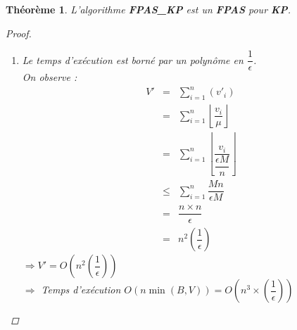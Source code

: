 \documentclass[12pt]{article}
\newcommand{\titre}[1]{\textcolor{title}{#1}}
\newcommand{\cdil}[1]{\left\lfloor #1 \right\rfloor}
\newtheorem{thm}{Th\'eor\`eme}[section]
\newtheorem{proof}{Preuve}[section]
\begin{document}
\begin{thm}
L'algorithme \textbf{FPAS\_KP} est un \textbf{FPAS} pour \textbf{\titre{KP}}.
\begin{proof}$ $
\begin{enumerate}
\item[a)] Le temps d'exécution est borné par un polynôme en $\dfrac{1}{\epsilon}$. \\
On observe :
\begin{eqnarray}
\nonumber V' & = & \sum_{i=1}^n(v'_i) \\
\nonumber    & = & \sum_{i=1}^n\cdil{\dfrac{v_i}{\mu}} \\
\nonumber    & = & \sum_{i=1}^n \cdil{\dfrac{v_i}{\dfrac{\epsilon M}{n}}} \\
\nonumber    & \leq & \sum_{i=1}^n \dfrac{Mn}{\epsilon M} \\
\nonumber    & = & \dfrac{n\times n}{\epsilon} \\
\nonumber    & = & n^2\left(\dfrac{1}{\epsilon}\right)
\end{eqnarray}
$\Rightarrow V'= O\left(n^2\left(\dfrac{1}{\epsilon}\right)\right)$\\
$\Longrightarrow$ Temps d'exécution $O(n\min(B,V)) = O\left(n^3\times \left(\dfrac{1}{\epsilon}\right)\right)$


\end{enumerate}
\end{proof}
\end{thm}
\end{document}
